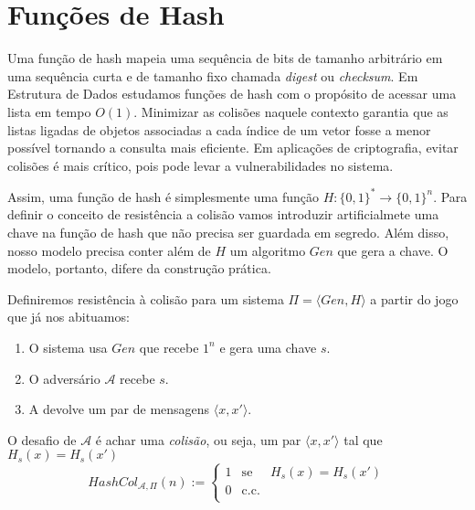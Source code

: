 \chapter{Funções de Hash}
\label{cha:hash}

Uma função de hash mapeia uma sequência de bits de tamanho arbitrário em uma sequência curta e de tamanho fixo chamada {\em digest} ou {\em checksum}.
Em Estrutura de Dados estudamos funções de hash com o propósito de acessar uma lista em tempo $O(1)$.
Minimizar as colisões naquele contexto garantia que as listas ligadas de objetos associadas a cada índice de um vetor fosse a menor possível tornando a consulta mais eficiente.
Em aplicações de criptografia, evitar colisões é mais crítico, pois pode levar a vulnerabilidades no sistema.

Assim, uma função de hash é simplesmente uma função $H: \{0,1\}^* \to \{0,1\}^n$.
Para definir o conceito de resistência a colisão vamos introduzir artificialmete uma chave na função de hash que não precisa ser guardada em segredo.
Além disso, nosso modelo precisa conter além de $H$ um algoritmo $Gen$ que gera a chave.
O modelo, portanto, difere da construção prática.

Definiremos resistência à colisão para um sistema $\Pi = \langle Gen, H \rangle$ a partir do jogo que já nos abituamos:
\begin{enumerate}
\item O sistema usa $Gen$ que recebe $1^n$ e gera uma chave $s$.
\item O adversário $\mathcal{A}$ recebe $s$.
\item A devolve um par de mensagens $\langle x, x' \rangle$.
\end{enumerate}

\begin{center}
\end{center}

O desafio de $\mathcal{A}$ é achar uma {\em colisão}, ou seja, um par $\langle x, x' \rangle$ tal que $H_s(x) = H_s(x')$
\begin{displaymath}
  HashCol_{\mathcal{A}, \Pi}(n) := \left\{
    \begin{array}{lcl}
      1 & \textrm{se} & H_s(x) = H_s(x')\\
      0 & \textrm{c.c.} &\\
    \end{array}
    \right.
\end{displaymath}

